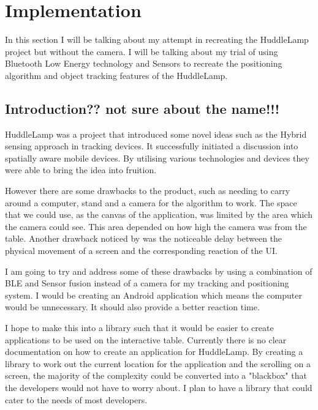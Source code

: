 \section{Implementation}

In this section I will be talking about my attempt in recreating the HuddleLamp project but without the camera. I will be talking about my trial of using Bluetooth Low Energy technology and Sensors to recreate the positioning algorithm and object tracking features of the HuddleLamp. 


\subsection{Introduction?? not sure about the name!!!}
HuddleLamp was a project that introduced some novel ideas such as the Hybrid sensing approach in tracking devices. It successfully initiated a discussion into spatially aware mobile devices. By utilising various technologies and devices they were able to bring the idea into fruition. 

However there are some drawbacks to the product, such as needing to carry around a computer, stand and a camera for the algorithm to work. The space that we could use, as the canvas of the application, was limited by the area which the camera could see. This area depended on how high the camera was from the table. Another drawback noticed by \citeauthor{huddelamp-paper} was the noticeable delay between the physical movement of a screen and the corresponding reaction of the UI\cite{huddelamp-paper}. 

I am going to try and address some of these drawbacks by using a combination of BLE and Sensor fusion instead of a camera for my tracking and positioning system. I would be creating an Android application which means the computer would be unnecessary. It should also provide a better reaction time. 

I hope to make this into a library such that it would be easier to create applications to be used on the interactive table. Currently there is no clear documentation on how to create an application for HuddleLamp. By creating a library to work out the current location for the application and the scrolling on a screen, the majority of the complexity could be converted into a "blackbox" that the developers would not have to worry about. I plan to have a library that could cater to the needs of most developers. 


